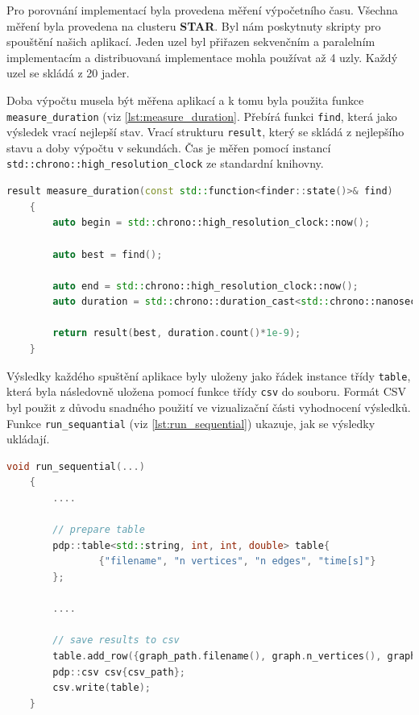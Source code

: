 Pro porovnání implementací byla provedena měření výpočetního času.
Všechna měření byla provedena na clusteru \textbf{STAR}.
Byl nám poskytnuty skripty pro spouštění našich aplikací.
Jeden uzel byl přiřazen sekvenčním a paralelním implementacím a distribuovaná implementace mohla používat až 4 uzly.
Každý uzel se skládá z 20 jader.

Doba výpočtu musela být měřena aplikací a k tomu byla použita funkce \texttt{measure\_duration} (viz \ref{lst:measure_duration}.
Přebírá funkci \texttt{find}, která jako výsledek vrací nejlepší stav.
Vrací strukturu \texttt{result}, který se skládá z nejlepšího stavu a doby výpočtu v sekundách.
Čas je měřen pomocí instancí \texttt{std::chrono::high\_resolution\_clock} ze standardní knihovny.

\begin{lstlisting}[language=C++, label={lst:measure_duration}, title={Funkce pro měření doby výpočtu}]
    result measure_duration(const std::function<finder::state()>& find)
    {
        auto begin = std::chrono::high_resolution_clock::now();
    
        auto best = find();
    
        auto end = std::chrono::high_resolution_clock::now();
        auto duration = std::chrono::duration_cast<std::chrono::nanoseconds>(end-begin);
    
        return result(best, duration.count()*1e-9);
    }
\end{lstlisting}

Výsledky každého spuštění aplikace byly uloženy jako řádek instance třídy \texttt{table}, která byla následovně uložena pomocí funkce třídy \texttt{csv} do souboru.
Formát CSV byl použit z důvodu snadného použití ve vizualizační části vyhodnocení výsledků.
Funkce \texttt{run\_sequantial} (viz \ref{lst:run_sequential}) ukazuje, jak se výsledky ukládají.

\begin{lstlisting}[language=C++, label={lst:run_sequential}, title={Funkce pro měření doby výpočtu}]
    void run_sequential(...)
    {
        ....
    
        // prepare table
        pdp::table<std::string, int, int, double> table{
                {"filename", "n vertices", "n edges", "time[s]"}
        };
    
        ....
    
        // save results to csv
        table.add_row({graph_path.filename(), graph.n_vertices(), graph.n_edges(), res.duration});
        pdp::csv csv{csv_path};
        csv.write(table);
    }
\end{lstlisting}

